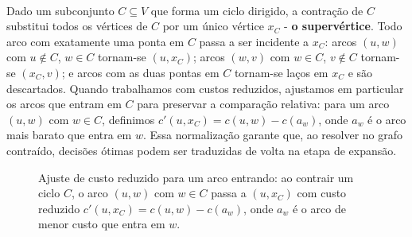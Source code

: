 \documentclass[12pt,a4paper]{article}
\def\emph#1{#1}%
\begin{document}
\paragraph{}
Dado um subconjunto \(C\subseteq V\) que forma um ciclo dirigido, a \emph{contração de \(C\)} substitui todos os vértices de \(C\) por um único vértice \(x_C\) - \textbf{o supervértice}. Todo arco com exatamente uma ponta em \(C\) passa a ser incidente a \(x_C\): arcos \((u,w)\) com \(u\notin C\), \(w\in C\) tornam-se \((u, x_C)\); arcos \((w,v)\) com \(w\in C\), \(v\notin C\) tornam-se \((x_C, v)\); e arcos com as duas pontas em \(C\) tornam-se laços em \(x_C\) e são descartados. Quando trabalhamos com \emph{custos reduzidos}, ajustamos em particular os arcos que \emph{entram} em \(C\) para preservar a comparação relativa: para um arco \((u,w)\) com \(w\in C\), definimos \(c'(u,x_C) = c(u,w) - c(a_w)\), onde \(a_w\) é o arco mais barato que entra em \(w\). Essa normalização garante que, ao resolver no grafo contraído, decisões ótimas podem ser traduzidas de volta na etapa de expansão.


\begin{figure}[H]\centering
    \caption{Ajuste de custo reduzido para um arco \emph{entrando}: ao contrair um ciclo $C$, o arco $(u,w)$ com $w\in C$ passa a $(u,x_C)$ com custo reduzido $c'(u,x_C)=c(u,w)-c(a_w)$, onde $a_w$ é o arco de menor custo que entra em $w$.}
    \label{fig:chu-liu-reduced-cost}
\end{figure}
\end{document}

